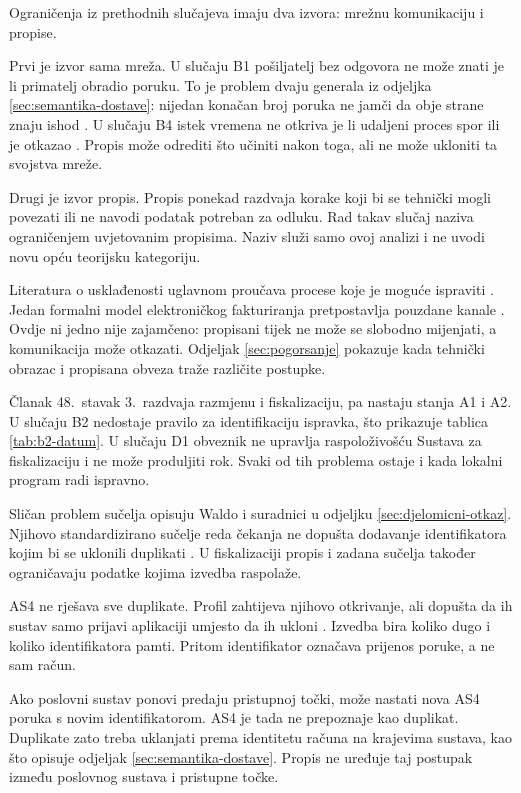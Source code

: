 Ograničenja iz prethodnih slučajeva imaju dva izvora: mrežnu komunikaciju i
propise.

Prvi je izvor sama mreža. U slučaju B1 pošiljatelj bez odgovora ne može
znati je li primatelj obradio poruku. To je problem dvaju generala iz
odjeljka \ref{sec:semantika-dostave}: nijedan konačan broj poruka ne jamči
da obje strane znaju ishod \cite{gray1978notes}. U slučaju B4 istek vremena
ne otkriva je li udaljeni proces spor ili je otkazao
\cite{chandra1996failuredetectors}. Propis može odrediti što učiniti nakon
toga, ali ne može ukloniti ta svojstva mreže.

Drugi je izvor propis. Propis ponekad razdvaja korake koji bi se tehnički
mogli povezati ili ne navodi podatak potreban za odluku. Rad takav slučaj
naziva ograničenjem uvjetovanim propisima. Naziv služi samo ovoj analizi i
ne uvodi novu opću teorijsku kategoriju.

Literatura o usklađenosti uglavnom proučava procese koje je moguće
ispraviti \cite{sadiq2007compliance,ly2015compliance}. Jedan formalni model
elektroničkog fakturiranja pretpostavlja pouzdane kanale
\cite{attali2004chilean}. Ovdje ni jedno nije zajamčeno: propisani tijek ne
može se slobodno mijenjati, a komunikacija može otkazati. Odjeljak
\ref{sec:pogorsanje} pokazuje kada tehnički obrazac i propisana obveza traže
različite postupke.

Članak 48.\ stavak 3.\ razdvaja razmjenu i fiskalizaciju, pa nastaju stanja
A1 i A2. U slučaju B2 nedostaje pravilo za identifikaciju ispravka, što
prikazuje tablica \ref{tab:b2-datum}. U slučaju D1 obveznik ne upravlja
raspoloživošću Sustava za fiskalizaciju i ne može produljiti rok. Svaki od
tih problema ostaje i kada lokalni program radi ispravno.

Sličan problem sučelja opisuju Waldo i suradnici u odjeljku
\ref{sec:djelomicni-otkaz}. Njihovo standardizirano sučelje reda čekanja ne
dopušta dodavanje identifikatora kojim bi se uklonili duplikati
\cite{waldo1994note}. U fiskalizaciji propis i zadana sučelja također
ograničavaju podatke kojima izvedba raspolaže.

AS4 ne rješava sve duplikate. Profil zahtijeva njihovo otkrivanje, ali
dopušta da ih sustav samo prijavi aplikaciji umjesto da ih ukloni
\cite{oasis2013as4}. Izvedba bira koliko dugo i koliko identifikatora pamti.
Pritom identifikator označava prijenos poruke, a ne sam račun.

Ako poslovni sustav ponovi predaju pristupnoj točki, može nastati nova AS4
poruka s novim identifikatorom. AS4 je tada ne prepoznaje kao duplikat.
Duplikate zato treba uklanjati prema identitetu računa na krajevima sustava,
kao što opisuje odjeljak \ref{sec:semantika-dostave}. Propis ne uređuje taj
postupak između poslovnog sustava i pristupne točke.

